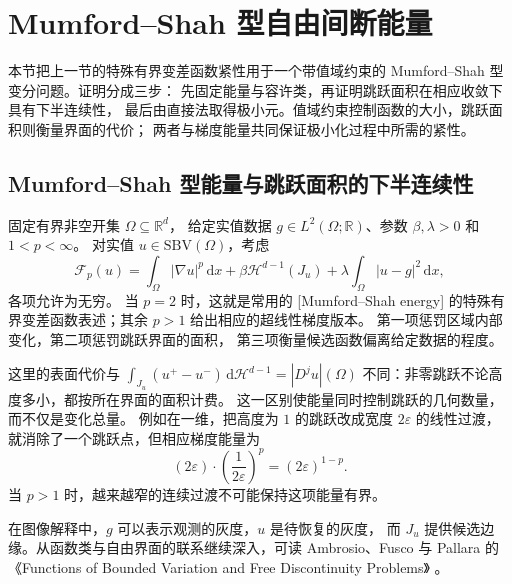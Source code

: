 \section{Mumford--Shah 型自由间断能量}
\label{b1:sec:2805}

本节把上一节的特殊有界变差函数紧性用于一个带值域约束的
Mumford--Shah 型变分问题。证明分成三步：
先固定能量与容许类，再证明跳跃面积在相应收敛下具有下半连续性，
最后由直接法取得极小元。值域约束控制函数的大小，跳跃面积则衡量界面的代价；
两者与梯度能量共同保证极小化过程中所需的紧性。

\subsection{Mumford--Shah 型能量与跳跃面积的下半连续性}
\label{b1:subsec:280402}

固定有界非空开集 \(\Omega\subseteq\mathbb R^d\)，
给定实值数据 \(g\in L^2(\Omega;\mathbb R)\)、参数 \(\beta,\lambda>0\) 和 \(1<p<\infty\)。
对实值 \(u\in \mathrm{SBV}(\Omega)\)，考虑
\begin{equation}\label{b1:eq:mumford-shah-energy}
 \mathcal F_p(u)=
 \int_\Omega|\nabla u|^p\,\mathrm dx
 +\beta\mathcal H^{d-1}(J_u)
 +\lambda\int_\Omega|u-g|^2\,\mathrm dx,
\end{equation}
各项允许为无穷。
当 \(p=2\) 时，这就是常用的
[Mumford--Shah energy]%
的特殊有界变差函数表述；其余 \(p>1\) 给出相应的超线性梯度版本。
第一项惩罚区域内部变化，第二项惩罚跳跃界面的面积，
第三项衡量候选函数偏离给定数据的程度。

\ProseParagraphBreak

这里的表面代价与
\(\int_{J_u}(u^+-u^-)\,\mathrm d\mathcal H^{d-1}=|D^ju|(\Omega)\)
不同：非零跳跃不论高度多小，都按所在界面的面积计费。
这一区别使能量同时控制跳跃的几何数量，而不仅是变化总量。
例如在一维，把高度为 \(1\) 的跳跃改成宽度 \(2\varepsilon\) 的线性过渡，
就消除了一个跳跃点，但相应梯度能量为
\[
 (2\varepsilon)\cdot\left(\frac1{2\varepsilon}\right)^p
 =(2\varepsilon)^{1-p}.
\]
当 \(p>1\) 时，越来越窄的连续过渡不可能保持这项能量有界。

\ProseParagraphBreak

在图像解释中，\(g\) 可以表示观测的灰度，\(u\) 是待恢复的灰度，
而 \(J_u\) 提供候选边缘。从函数类与自由界面的联系继续深入，可读
Ambrosio、Fusco 与 Pallara 的《Functions of Bounded Variation and Free Discontinuity Problems》%
\cite[Chapters 4--6]{Ambrosio2000Functions}。


